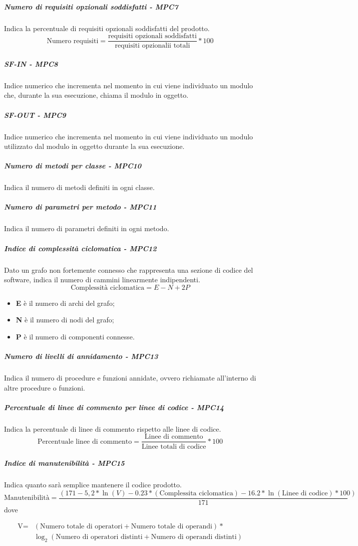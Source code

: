 \subparagraph{Numero di requisiti opzionali soddisfatti - MPC7}
Indica la percentuale di requisiti opzionali soddisfatti del prodotto.
\begin{equation*}
\text{Numero requisiti} = \frac{\text{requisiti opzionali soddisfatti}}{\text{requisiti opzionalii totali}} * 100
\end{equation*}
\subparagraph{SF-IN - MPC8}
Indice numerico che incrementa nel momento in cui viene individuato un modulo che, durante la sua esecuzione, chiama il modulo in oggetto.
\subparagraph{SF-OUT - MPC9}
Indice numerico che incrementa nel momento in cui viene individuato un modulo utilizzato dal modulo in oggetto durante la sua esecuzione.
\subparagraph{Numero di metodi per classe - MPC10}
Indica il numero di metodi definiti in ogni classe.
\subparagraph{Numero di parametri per metodo - MPC11}
Indica il numero di parametri definiti in ogni metodo.
\subparagraph{Indice di complessità ciclomatica - MPC12}
Dato un grafo non fortemente connesso che rappresenta una sezione di codice del software, indica il numero di cammini linearmente indipendenti.
\begin{equation*}
\text{Complessità ciclomatica} = E - N + 2P
\end{equation*}
\begin{itemize}
	\item \textbf{E} è il numero di archi del grafo;
	\item \textbf{N} è il numero di nodi del grafo;
	\item \textbf{P} è il numero di componenti connesse.
\end{itemize}
\subparagraph{Numero di livelli di annidamento - MPC13}
Indica il numero di procedure e funzioni annidate, ovvero richiamate all'interno di altre procedure o funzioni.
\subparagraph{Percentuale di linee di commento per linee di codice - MPC14}
Indica la percentuale di linee di commento rispetto alle linee di codice.
\begin{equation*}
\text{Percentuale linee di commento} = \frac{\text{Linee di commento}}{\text{Linee totali di codice}} * 100
\end{equation*}
\subparagraph{Indice di manutenibilità - MPC15}
Indica quanto sarà semplice mantenere il codice prodotto.
\begin{equation*}
\text{Manutenibilità} =\frac{(171 - 5,2 * \ln(V) - 0.23 * (\text{Complessita ciclomatica}) - 16.2 * \ln(\text{Linee di codice})*100)}{171}
\end{equation*}
dove

\begin{align*}
\text{V} = & (\text{Numero totale di operatori} + \text{Numero totale di operandi})* \\
& \log_2 (\text{Numero di operatori distinti}+\text{Numero di operandi distinti})
\end{align*}


